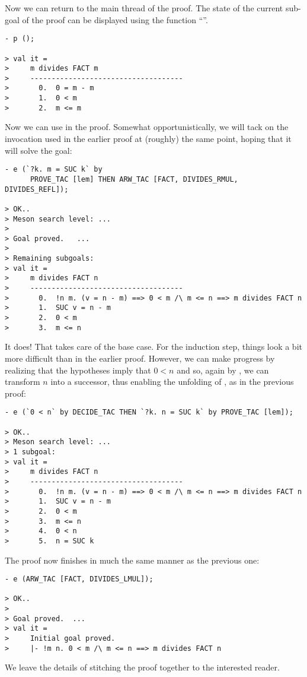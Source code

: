 Now we can return to the main thread of the proof.  The state of the
current sub-goal of the proof can be displayed using the function
``''.

\begin{session}\begin{verbatim}
- p ();

> val it =
>     m divides FACT m
>     ------------------------------------
>       0.  0 = m - m
>       1.  0 < m
>       2.  m <= m
\end{verbatim}\end{session}
    Now we can use  in the proof. Somewhat opportunistically,
    we will tack on the invocation used in the earlier proof at
    (roughly) the same point, hoping that it will solve the goal:
\begin{session}\begin{verbatim}
- e (`?k. m = SUC k` by
      PROVE_TAC [lem] THEN ARW_TAC [FACT, DIVIDES_RMUL, DIVIDES_REFL]);

> OK..
> Meson search level: ...
>
> Goal proved.   ...
>
> Remaining subgoals:
> val it =
>     m divides FACT n
>     ------------------------------------
>       0.  !n m. (v = n - m) ==> 0 < m /\ m <= n ==> m divides FACT n
>       1.  SUC v = n - m
>       2.  0 < m
>       3.  m <= n
\end{verbatim}\end{session}
    It does! That takes care of the base case. For the induction step,
    things look a bit more difficult than in the earlier proof.
    However, we can make progress by realizing that the hypotheses
    imply that $0 < n$ and so, again by , we can transform $n$
    into a successor, thus enabling the unfolding of , as in
    the previous proof:
\begin{session}\begin{verbatim}
- e (`0 < n` by DECIDE_TAC THEN `?k. n = SUC k` by PROVE_TAC [lem]);

> OK..
> Meson search level: ...
> 1 subgoal:
> val it =
>     m divides FACT n
>     ------------------------------------
>       0.  !n m. (v = n - m) ==> 0 < m /\ m <= n ==> m divides FACT n
>       1.  SUC v = n - m
>       2.  0 < m
>       3.  m <= n
>       4.  0 < n
>       5.  n = SUC k
\end{verbatim}\end{session}
\noindent The proof now finishes in much the same manner as the previous one:
\begin{session}\begin{verbatim}
- e (ARW_TAC [FACT, DIVIDES_LMUL]);

> OK..
>
> Goal proved.  ...
> val it =
>     Initial goal proved.
>     |- !m n. 0 < m /\ m <= n ==> m divides FACT n
\end{verbatim}\end{session}
\noindent We leave the details of stitching the proof together to the interested
reader.

